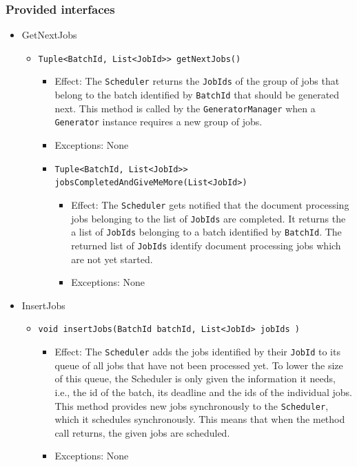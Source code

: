 \documentclass[a4paper,10pt]{article}
\begin{document}
\subsubsection*{Provided interfaces}
\begin{itemize}
    \item GetNextJobs
    \begin{itemize}
        \item \texttt{Tuple<BatchId, List<JobId>> getNextJobs()}
        \begin{itemize}
            \item Effect: The \texttt{Scheduler} returns the \texttt{JobIds} of the group of jobs that belong to the batch identified by \texttt{BatchId} that should be generated next. This method is called by the \texttt{GeneratorManager} when a \texttt{Generator} instance requires a new group of jobs.
            \item Exceptions: None


            \item \texttt{Tuple<BatchId, List<JobId>>  jobsCompletedAndGiveMeMore(List<JobId>)}
            \begin{itemize}
                \item Effect: The \texttt{Scheduler} gets notified that the document processing jobs belonging to the list of \texttt{JobIds} are completed. It returns the a list of \texttt{JobIds} belonging to a batch identified by \texttt{BatchId}. The returned list of \texttt{JobIds} identify document processing jobs which are not yet started.
                \item Exceptions: None
            \end{itemize}
        \end{itemize}
    \end{itemize}

    \item InsertJobs
    \begin{itemize}
        \item \texttt{void insertJobs(BatchId batchId, List<JobId> jobIds )}
        \begin{itemize}
            \item Effect: The \texttt{Scheduler} adds the jobs identified by their \texttt{JobId} to its queue of all jobs that have not been processed yet. To lower the size of this queue, the Scheduler is only given the information it needs, i.e., the id of the batch, its deadline and the ids of the individual jobs. This method provides new jobs synchronously to the \texttt{Scheduler}, which it schedules synchronously. This means that when the method call returns, the given jobs are scheduled.
            \item Exceptions: None
        \end{itemize}
    \end{itemize}
    

\end{itemize}
\end{document}
